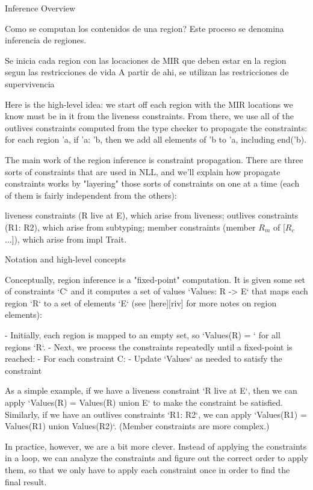\documentclass[11pt, a4paper]{article}
\begin{document}
Inference Overview

Como se computan los contenidos de una region?
Este proceso se denomina inferencia de regiones.

Se inicia cada region con las locaciones de MIR que deben estar en la region segun las restricciones de vida 
A partir de ahi, se utilizan las restricciones de supervivencia 

Here is the high-level idea: we start off each region with the MIR locations we know must be in it from the liveness constraints. From there, we use all of the outlives constraints computed from the type checker to propagate the constraints: for each region 'a, if 'a: 'b, then we add all elements of 'b to 'a, including end('b).

The main work of the region inference is constraint propagation. There are three sorts of constraints that are used in NLL, and we'll explain how propagate constraints works by "layering" those sorts of constraints on one at a time (each of them is fairly independent from the others):

    liveness constraints (R live at E), which arise from liveness;
    outlives constraints (R1: R2), which arise from subtyping;
    member constraints (member $R_m$ of [$R_c$...]), which arise from impl Trait.

Notation and high-level concepts

Conceptually, region inference is a "fixed-point" computation. It is
given some set of constraints `{C}` and it computes a set of values
`Values: R -> {E}` that maps each region `R` to a set of elements
`{E}` (see [here][riv] for more notes on region elements):

- Initially, each region is mapped to an empty set, so `Values(R) =
  {}` for all regions `R`.
- Next, we process the constraints repeatedly until a fixed-point is reached:
  - For each constraint C:
    - Update `Values` as needed to satisfy the constraint

As a simple example, if we have a liveness constraint `R live at E`,
then we can apply `Values(R) = Values(R) union {E}` to make the
constraint be satisfied. Similarly, if we have an outlives constraints
`R1: R2`, we can apply `Values(R1) = Values(R1) union Values(R2)`.
(Member constraints are more complex.)

In practice, however, we are a bit more clever. Instead of applying
the constraints in a loop, we can analyze the constraints and figure
out the correct order to apply them, so that we only have to apply
each constraint once in order to find the final result.
\end{document}
